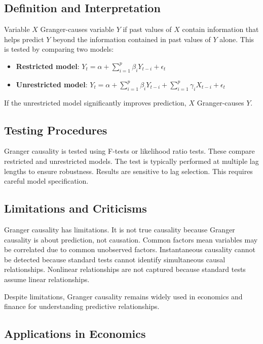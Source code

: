 \subsection{Definition and Interpretation}

Variable \(X\) Granger-causes variable \(Y\) if past values of \(X\) contain information that helps predict \(Y\) beyond the information contained in past values of \(Y\) alone. This is tested by comparing two models:

\begin{itemize}
\item \textbf{Restricted model}: \(Y_t = \alpha + \sum_{i=1}^{p} \beta_i Y_{t-i} + \epsilon_t\)
\item \textbf{Unrestricted model}: \(Y_t = \alpha + \sum_{i=1}^{p} \beta_i Y_{t-i} + \sum_{i=1}^{p} \gamma_i X_{t-i} + \epsilon_t\)
\end{itemize}

If the unrestricted model significantly improves prediction, \(X\) Granger-causes \(Y\).

\subsection{Testing Procedures}

Granger causality is tested using F-tests or likelihood ratio tests. These compare restricted and unrestricted models. The test is typically performed at multiple lag lengths to ensure robustness. Results are sensitive to lag selection. This requires careful model specification.

\subsection{Limitations and Criticisms}

Granger causality has limitations. It is not true causality because Granger causality is about prediction, not causation. Common factors mean variables may be correlated due to common unobserved factors. Instantaneous causality cannot be detected because standard tests cannot identify simultaneous causal relationships. Nonlinear relationships are not captured because standard tests assume linear relationships.

Despite limitations, Granger causality remains widely used in economics and finance for understanding predictive relationships.

\subsection{Applications in Economics}

